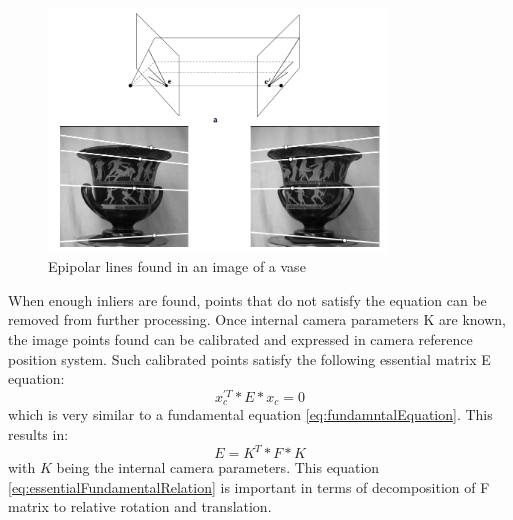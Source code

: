 \begin{figure}[p]
    \centering
    \includegraphics[width=0.8\textwidth]{EpipolarGeometry}
    \caption{Epipolar lines found in an image of a vase \cite{HartleyMultipleView}}
    \label{fig:EpipolarGeometry}
\end{figure}
When enough inliers are found, points that do not satisfy the equation can be removed from further processing.
Once internal camera parameters K are known, the image points found can be calibrated and expressed in camera reference position system. Such calibrated points satisfy the following essential matrix E equation:
\begin{equation} \label{eq:essentialEquation}
{x}_{c}^{'T} * E * x_{c} = 0
\end{equation} 
which is very similar to a fundamental equation \ref{eq:fundamntalEquation}. This results in:
\begin{equation} \label{eq:essentialFundamentalRelation}
E = K^{T} * F * K
\end{equation} 
with $K$ being the internal camera parameters. This equation \ref{eq:essentialFundamentalRelation} is important in terms of decomposition of F matrix to relative rotation and translation.
